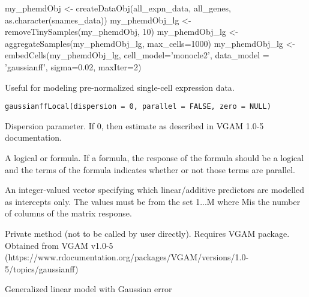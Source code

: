 \documentclass[a4paper]{book}
\begin{document}
%
\begin{Examples}
\begin{ExampleCode}
my_phemdObj <- createDataObj(all_expn_data, all_genes, as.character(snames_data))
my_phemdObj_lg <- removeTinySamples(my_phemdObj, 10)
my_phemdObj_lg <- aggregateSamples(my_phemdObj_lg, max_cells=1000)
my_phemdObj_lg <- embedCells(my_phemdObj_lg, cell_model='monocle2', data_model = 'gaussianff', sigma=0.02, maxIter=2)
\end{ExampleCode}
\end{Examples}
%
\begin{Description}\relax
Useful for modeling pre-normalized single-cell expression data.
\end{Description}
%
\begin{Usage}
\begin{verbatim}
gaussianffLocal(dispersion = 0, parallel = FALSE, zero = NULL)
\end{verbatim}
\end{Usage}
%
\begin{Arguments}
\begin{ldescription}
\item[\code{dispersion}] Dispersion parameter. If 0, then estimate as described in VGAM 1.0-5 documentation.

\item[\code{parallel}] A logical or formula. If a formula, the response of the formula should be a logical and the terms of the formula indicates whether or not those terms are parallel.

\item[\code{zero}] An integer-valued vector specifying which linear/additive predictors are modelled as intercepts only. The values must be from the set 1...M where Mis the number of columns of the matrix response.
\end{ldescription}
\end{Arguments}
%
\begin{Details}\relax
Private method (not to be called by user directly). Requires VGAM package. Obtained from VGAM v1.0-5 (https://www.rdocumentation.org/packages/VGAM/versions/1.0-5/topics/gaussianff)
\end{Details}
%
\begin{Value}
Generalized linear model with Gaussian error
\end{Value}
\end{document}

